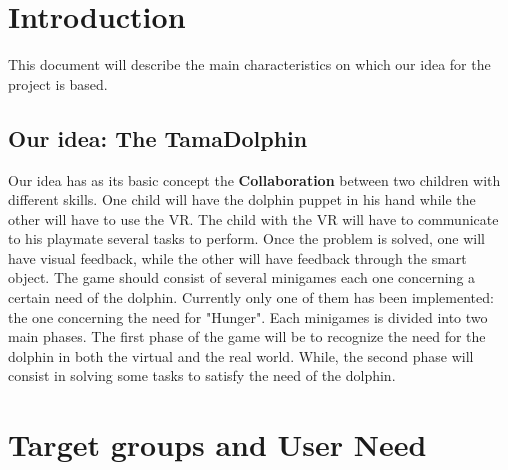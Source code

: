 \documentclass [12pt]{article}
\begin{document}
\tableofcontents

\section{Introduction}
This document will describe the main characteristics on which our idea for the project is based.
\subsection{Our idea: The TamaDolphin}
Our idea has as its basic concept the \textbf{Collaboration} between two children with different skills.
One child will have the dolphin puppet in his hand while the other will have to use the VR.
The child with the VR will have to communicate to his playmate several tasks to perform. Once the problem is solved, one will have visual feedback, while the other will have feedback through the smart object.
The game should consist of several minigames each one concerning a certain need of the dolphin. Currently only one of them has been implemented: the one concerning the need for "Hunger". Each minigames is divided into two main phases. 
The first phase of the game will be to recognize the need for the dolphin in both the virtual and the real world. While, the second phase  will consist in solving some tasks to satisfy the need of the dolphin.


\section{Target groups and User Need}
\end{document}
